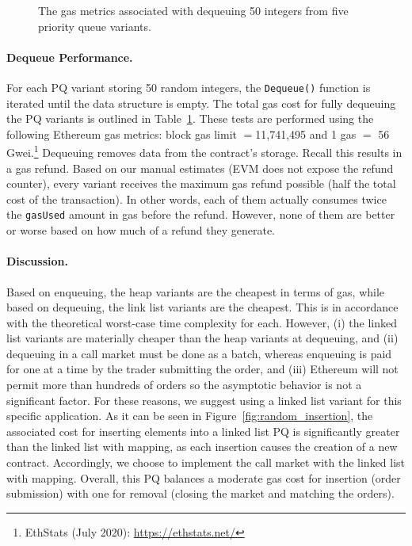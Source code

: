 \begin{figure}
\begin{floatrow}
{\begin{tabular}{|>{\centering}m{2cm} |>{\centering}m{1.15cm} |>{\centering}m{1.15cm} |>{\centering\arraybackslash}m{0.2cm}|}
\end{tabular}
}{%
 \caption{\scriptsize{The gas metrics associated with dequeuing 50 integers from five priority queue variants.}
\label{tab:PQUnitTests}}%
}
\end{floatrow}
\end{figure}










\paragraph{Dequeue Performance.} For each PQ variant storing 50 random integers, the \texttt{Dequeue()} function is iterated until the data structure is empty. The total gas cost for fully dequeuing the PQ variants is outlined in Table~\ref{tab:PQUnitTests}. These tests are performed using the following Ethereum gas metrics: block gas limit $=$11,741,495 and 1 gas $=$ 56 Gwei.\footnote{EthStats (July 2020): \url{https://ethstats.net/}} Dequeuing removes data from the contract's storage. Recall this results in a gas refund. Based on our manual estimates (EVM does not expose the refund counter), every variant receives the maximum gas refund possible (\ie half the total cost of the transaction). In other words, each of them actually consumes twice the \texttt{gasUsed} amount in gas before the refund. However, none of them are better or worse based on how much of a refund they generate.

\paragraph{Discussion.} Based on enqueuing, the heap variants are the cheapest in terms of gas, while based on dequeuing, the link list variants are the cheapest. This is in accordance with the theoretical worst-case time complexity for each. However, (i) the linked list variants are materially cheaper than the heap variants at dequeuing, and (ii) dequeuing in a call market must be done as a batch, whereas enqueuing is paid for one at a time by the trader submitting the order, and (iii) Ethereum will not permit more than hundreds of orders so the asymptotic behavior is not a significant factor. For these reasons, we suggest using a linked list variant for this specific application. As it can be seen in Figure~\ref{fig:random_insertion}, the associated cost for inserting elements into a linked list PQ is significantly greater than the linked list with mapping, as each insertion causes the creation of a new contract. Accordingly, we choose to implement the call market with the linked list with mapping. Overall, this PQ balances a moderate gas cost for insertion (\ie order submission) with one for removal (\ie closing the market and matching the orders).

